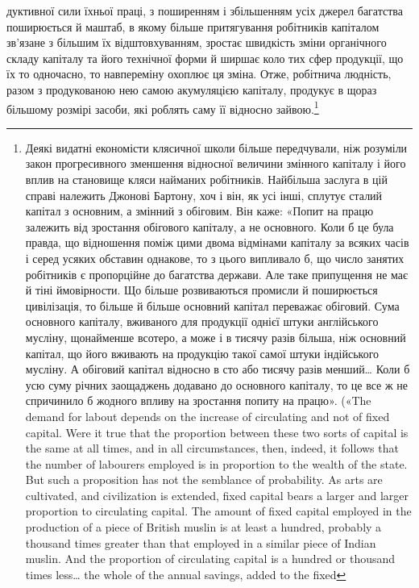 \parcont{}  %
дуктивної сили їхньої праці, з поширенням і збільшенням усіх
джерел багатства поширюється й маштаб, в якому більше притягування
робітників капіталом зв’язане з більшим їх відштовхуванням,
зростає швидкість зміни органічного складу капіталу
та його технічної форми й ширшає коло тих сфер продукції, що
їх то одночасно, то навпереміну охоплює ця зміна. Отже, робітнича
людність, разом з продукованою нею самою акумуляцією
капіталу, продукує в щораз більшому розмірі засоби, які роблять
саму її відносно зайвою.\footnote{
Деякі видатні економісти клясичної школи більше передчували,
ніж розуміли закон прогресивного зменшення відносної величини змінного
капіталу і його вплив на становище кляси найманих робітників.
Найбільша заслуга в цій справі належить Джонові Бартону, хоч і він, як
усі інші, сплутує сталий капітал з основним, а змінний з обіговим. Він
каже: «Попит на працю залежить від зростання обігового капіталу, а
не основного. Коли б це була правда, що відношення поміж цими двома
відмінами капіталу за всяких часів і серед усяких обставин однакове,
то з цього випливало б, що число занятих робітників є пропорційне до
багатства держави. Але таке припущення не має й тіні ймовірности. Що
більше розвиваються промисли й поширюється цивілізація, то більше
й більше основний капітал переважає обіговий. Сума основного капіталу,
вживаного для продукції однієї штуки англійського мусліну, щонайменше
всотеро, а може і в тисячу разів більша, ніж основний капітал, що його
вживають на продукцію такої самої штуки індійського мусліну. А обіговий
капітал відносно в сто або тисячу разів менший\dots{} Коли б усю суму річних
заощаджень додавано до основного капіталу, то це все ж не спричинило
б жодного впливу на зростання попиту на працю». («The demand for
labout depends on the increase of circulating and not of fixed capital. Were
it true that the proportion between these two sorts of capital is the same at
all times, and in all circumstances, then, indeed, it follows that the number
of labourers employed is in proportion to the wealth of the state.
But such a proposition has not the semblance of probability. As arts are
cultivated, and civilization is extended, fixed capital bears a larger and
larger proportion to circulating capital. The amount of fixed capital employed
in the production of a piece of British muslin is at least a hundred, probably
a thousand times greater than that employed in a similar piece of
Indian muslin. And the proportion of circulating capital is a hundred or thousand times less\dots{} the whole of the annual savings, added to the fixed
}
